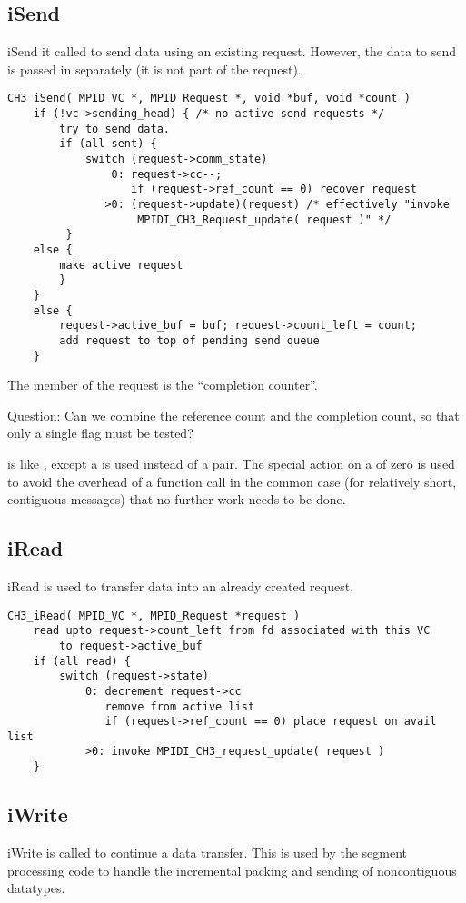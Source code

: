 \documentclass{article}
\begin{document}
\subsection{iSend}
iSend it called to send data using an existing request.  However, the data to
send is passed in separately (it is not part of the request).
\begin{verbatim}
CH3_iSend( MPID_VC *, MPID_Request *, void *buf, void *count )
    if (!vc->sending_head) { /* no active send requests */
        try to send data.
        if (all sent) {
            switch (request->comm_state)
                0: request->cc--; 
                   if (request->ref_count == 0) recover request
               >0: (request->update)(request) /* effectively "invoke 
                    MPIDI_CH3_Request_update( request )" */
         }
    else {
        make active request
        }
    }
    else {
        request->active_buf = buf; request->count_left = count;
        add request to top of pending send queue
    }
\end{verbatim}
The member  of the request is the ``completion counter''.

Question: Can we combine the reference count and the completion count,
so that only a single flag must be tested?

 is like , except a  is
used instead of a  pair.  The special action on a
 of zero is used to avoid the overhead of a function
call in the common case (for relatively short, contiguous messages)
that no further work needs to be done.

\subsection{iRead}
iRead is used to transfer data into an already created request.  

\begin{verbatim}
CH3_iRead( MPID_VC *, MPID_Request *request )
    read upto request->count_left from fd associated with this VC
        to request->active_buf
    if (all read) {
        switch (request->state) 
            0: decrement request->cc
               remove from active list
               if (request->ref_count == 0) place request on avail list
            >0: invoke MPIDI_CH3_request_update( request )
    }
\end{verbatim}

\subsection{iWrite}
iWrite is called to continue a data transfer.  This is used by the
segment processing code to handle the incremental packing and sending
of noncontiguous datatypes.
\end{document}
